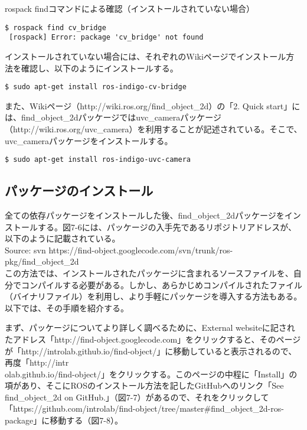 rospack findコマンドによる確認（インストールされていない場合）

\begin{lstlisting}[language=ROS]
$ rospack find cv_bridge
 [rospack] Error: package 'cv_bridge' not found
\end{lstlisting}

インストールされていない場合には、それぞれのWikiページでインストール方法を確認し、以下のようにインストールする。

\begin{lstlisting}[language=ROS]
$ sudo apt-get install ros-indigo-cv-bridge
\end{lstlisting}

また、Wikiページ（http://wiki.ros.org/find\_object\_2d）の「2. Quick start」には、find\_object\_2dパッケージではuvc\_cameraパッケージ（http://wiki.ros.org/uvc\_camera）を利用することが記述されている。そこで、uvc\_cameraパッケージをインストールする。

\begin{lstlisting}[language=ROS]
$ sudo apt-get install ros-indigo-uvc-camera
\end{lstlisting}

\subsection{パッケージのインストール}

全ての依存パッケージをインストールした後、find\_object\_2dパッケージをインストールする。図7-6には、パッケージの入手先であるリポジトリアドレスが、以下のように記載されている。\\

Source: svn https://find-object.googlecode.com/svn/trunk/ros-pkg/find\_object\_2d\\

この方法では、インストールされたパッケージに含まれるソースファイルを、自分でコンパイルする必要がある。しかし、あらかじめコンパイルされたファイル（バイナリファイル）を利用し、より手軽にパッケージを導入する方法もある。以下では、その手順を紹介する。

まず、パッケージについてより詳しく調べるために、External websiteに記されたアドレス「http://find-object.googlecode.com」をクリックすると、そのページが「http://introlab.github.io/find-object/」に移動していると表示されるので、再度「http://intr\\olab.github.io/find-object/」をクリックする。このページの中程に「Install」の項があり、そこにROSのインストール方法を記したGitHubへのリンク「See find\_object\_2d on GitHub.」（図7-7）があるので、それをクリックして「https://github.com/introlab/find-object/tree/master#find\_object\_2d-ros-package」に移動する（図7-8）。

